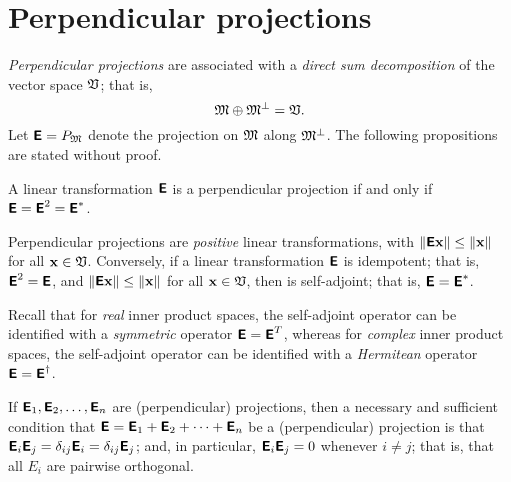 \section{Perpendicular projections}

{\em Perpendicular projections}
are associated with a {\em direct sum decomposition} of the vector space ${\frak V}$;
that is,
\begin{equation}
 {\frak M}\oplus {\frak M}^\perp ={\frak V}.
\label{2012-m-ch-fdvs-perp}
\end{equation}
Let $\textsf{\textbf{E}}=P_{\frak M}$ denote the projection on ${\frak M}$
along ${\frak M}^\perp$.  The following propositions are stated without proof.



A  linear transformation $\textsf{\textbf{E}}$ is a perpendicular projection
if and only if
$\textsf{\textbf{E}} = \textsf{\textbf{E}}^2=\textsf{\textbf{E}}^*$.

Perpendicular projections are {\em positive} linear transformations,
with
$\left\| \textsf{\textbf{E}}{\bf x} \right\| \le \| {\bf x} \|$
for all
${\bf x} \in {\frak V}$.
Conversely,
if a linear transformation $\textsf{\textbf{E}}$
is idempotent; that is,
$\textsf{\textbf{E}}^2=\textsf{\textbf{E}}$,
and  $\left\| \textsf{\textbf{E}}{\bf x} \right\| \le \| {\bf x} \|$
for all
${\bf x} \in {\frak V}$,
then  is self-adjoint; that is,
$\textsf{\textbf{E}}=\textsf{\textbf{E}}^\ast$.

Recall that
for {\em real} inner product spaces, the self-adjoint operator can be identified with a {\em symmetric} operator
$\textsf{\textbf{E}}=\textsf{\textbf{E}}^T$,
whereas
for {\em complex} inner product spaces, the self-adjoint operator can be identified with a {\em Hermitean} operator
$\textsf{\textbf{E}}=\textsf{\textbf{E}}^\dagger$.


If $\textsf{\textbf{E}}_1,\textsf{\textbf{E}}_2, \ldots , \textsf{\textbf{E}}_n$ are (perpendicular)
projections,
then a necessary and sufficient condition that
$\textsf{\textbf{E}} =\textsf{\textbf{E}}_1+\textsf{\textbf{E}}_2+\cdots +\textsf{\textbf{E}}_n$
be a (perpendicular) projection is that
 $\textsf{\textbf{E}}_i \textsf{\textbf{E}}_j =\delta_{ij}\textsf{\textbf{E}}_i =\delta_{ij}\textsf{\textbf{E}}_j$;
and, in particular,
$\textsf{\textbf{E}}_i \textsf{\textbf{E}}_j =0$
whenever $i\neq j$; that is, that all $E_i$ are pairwise orthogonal.

